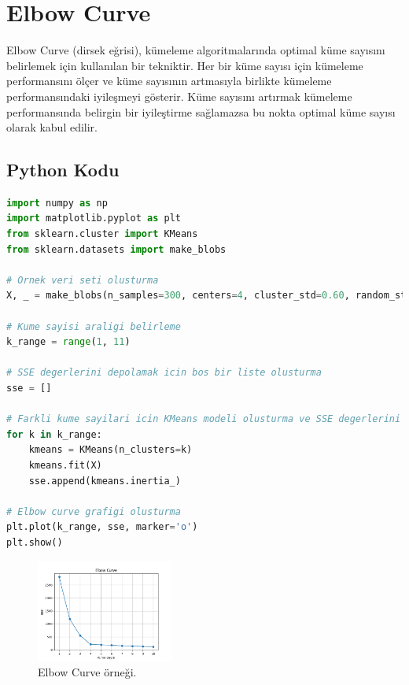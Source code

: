 \section{Elbow Curve}
Elbow Curve (dirsek eğrisi), kümeleme algoritmalarında optimal küme sayısını belirlemek için kullanılan bir tekniktir. Her bir küme sayısı için kümeleme performansını ölçer ve küme sayısının artmasıyla birlikte kümeleme performansındaki iyileşmeyi gösterir. Küme sayısını artırmak kümeleme performansında belirgin bir iyileştirme sağlamazsa bu nokta optimal küme sayısı olarak kabul edilir.

\subsection{Python Kodu}

\begin{lstlisting}[language=Python]
import numpy as np
import matplotlib.pyplot as plt
from sklearn.cluster import KMeans
from sklearn.datasets import make_blobs

# Ornek veri seti olusturma
X, _ = make_blobs(n_samples=300, centers=4, cluster_std=0.60, random_state=0)

# Kume sayisi araligi belirleme
k_range = range(1, 11)

# SSE degerlerini depolamak icin bos bir liste olusturma
sse = []

# Farkli kume sayilari icin KMeans modeli olusturma ve SSE degerlerini hesaplama
for k in k_range:
    kmeans = KMeans(n_clusters=k)
    kmeans.fit(X)
    sse.append(kmeans.inertia_)

# Elbow curve grafigi olusturma
plt.plot(k_range, sse, marker='o')
plt.show()
\end{lstlisting}

\begin{figure}[h]
    \centering
    \includegraphics[width=0.4\textwidth]{images/elbow_curve.png}
    \caption{Elbow Curve örneği.}
    \label{fig:enter-label}
\end{figure}

\newpage